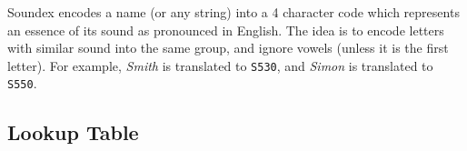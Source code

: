 Soundex \cite{soundex} encodes a name (or any string) into a 4 character code
which represents an essence of its sound as pronounced in English.
The idea is to encode letters with similar sound into the same group,
and ignore vowels (unless it is the first letter).
For example, \emph{Smith} is translated to \texttt{S530}, and
\emph{Simon} is translated to \texttt{S550}.






\subsection{Lookup Table}



